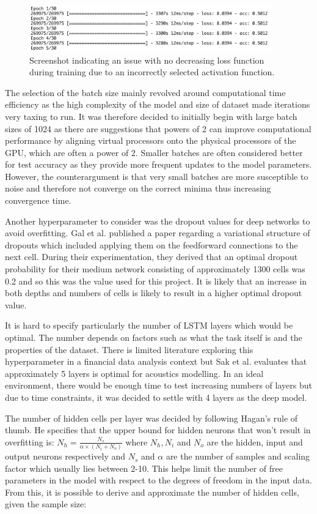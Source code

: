 \documentclass[10pt,onecolumn,letterpaper]{article}
\begin{document}
\begin{figure}[!hbt!]
\centering
\includegraphics[width=10.5cm]{problem_tuning.png}
\caption{Screenshot indicating an issue with no decreasing loss function during training due to an incorrectly selected activation function.}
\end{figure}

The selection of the batch size mainly revolved around computational time efficiency as the high complexity of the model and size of dataset made iterations very taxing to run. It was therefore decided to initially begin with large batch sizes of 1024 as there are suggestions that powers of 2 can improve computational performance by aligning virtual processors onto the physical processors of the GPU, which are often a power of 2. Smaller batches are often considered better for test accuracy as they provide more frequent updates to the model parameters. However, the counterargument is that very small batches are more susceptible to noise and therefore not converge on the correct minima thus increasing convergence time.

Another hyperparameter to consider was the dropout values for deep networks to avoid overfitting. Gal et al.\cite{Gal} published a paper regarding a variational structure of dropouts which included applying them on the feedforward connections to the next cell. During their experimentation, they derived that an optimal dropout probability for their medium network consisting of approximately 1300 cells was 0.2 and so this was the value used for this project. It is likely that an increase in both depths and numbers of cells is likely to result in a higher optimal dropout value.

It is hard to specify particularly the number of LSTM layers which would be optimal. The number depends on factors such as what the task itself is and the properties of the dataset. There is limited literature exploring this hyperparameter in a financial data analysis context but Sak et al.\cite{Sak} evaluates that approximately 5 layers is optimal for acoustics modelling. In an ideal environment, there would be enough time to test increasing numbers of layers but due to time constraints, it was decided to settle with 4 layers as the deep model. 

The number of hidden cells per layer was decided by following Hagan's rule of thumb\cite{Hagan}. He specifies that the upper bound for hidden neurons that won't result in overfitting is: $N_{h} = \frac{N_{s}}{\alpha \times (N_{i}+N_{o})}$ where $N_{h}, N_{i}$ and $N_{o}$ are the hidden, input and output neurons respectively and $N_{s}$ and $\alpha$ are the number of samples and scaling factor which usually lies between 2-10. This helps limit the number of free parameters in the model with respect to the degrees of freedom in the input data. From this, it is possible to derive and approximate the number of hidden cells, given the sample size: 
\end{document}
